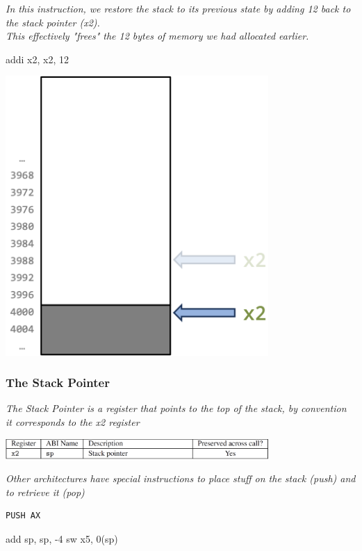 \begin{minipage}[htp]{0.4\textwidth}
\textit{In this instruction, we restore the stack to its previous state by adding 12 back to the stack pointer (x2).} \\ \textit{This effectively "frees" the 12 bytes of memory we had allocated earlier.}
\begin{assembly}
addi x2, x2, 12
\end{assembly}
\end{minipage}
\hfill
\vline
\hfill
\begin{minipage}[htp]{0.4\textwidth}
\begin{center}
\includegraphics[width=0.75\textwidth]{chapters/chapter1b/images/stack4.png}
\end{center}
\end{minipage}

\subsubsection{The Stack Pointer}
\textit{The Stack Pointer is a register that points to the top of the stack, by convention it corresponds to the x2 register} \\
\begin{center}
\includegraphics[width=0.75\textwidth]{chapters/chapter1b/images/conventions2.png}
\end{center}
\small
\textit{Other architectures have special instructions to place stuff on
the stack (push) and to retrieve it (pop)} \\
\vspace*{10px}
\begin{minipage}[htp]{0.4\textwidth}
\begin{lstlisting}
PUSH AX
\end{lstlisting}
\end{minipage}
\hfill
\vline
\hfill
\begin{minipage}[htp]{0.4\textwidth}
\begin{assembly}
add sp, sp, -4
sw x5, 0(sp)
\end{assembly}
\end{minipage}

